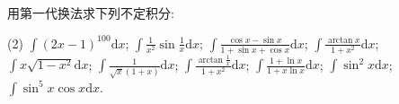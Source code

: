 \begin{exercise}[4.1.2]
    用第一代换法求下列不定积分:
    \begin{tasks}(2)
        \task $\displaystyle \int (2x - 1)^{100} \mathrm{d}x$;
        \task $\displaystyle \int \frac{1}{x^2} \sin \frac{1}{x} \mathrm{d}x$;
        \task $\displaystyle \int \frac{\cos x - \sin x}{1 + \sin x + \cos x} \mathrm{d}x$;
        \task $\displaystyle \int \frac{\arctan x}{1 + x^2} \mathrm{d}x$;
        \task $\displaystyle \int x \sqrt{1 - x^2} \mathrm{d}x$;
        \task $\displaystyle \int \frac{1}{\sqrt{x}(1 + x)} \mathrm{d}x$;
        \task $\displaystyle \int \frac{\arctan \frac{1}{x}}{1 + x^2} \mathrm{d}x$;
        \task $\displaystyle \int \frac{1 + \ln x}{1 + x \ln x} \mathrm{d}x$;
        \task $\displaystyle \int \sin^2 x \mathrm{d}x$;
        \task $\displaystyle \int \sin^5 x \cos x \mathrm{d}x$.
    \end{tasks}
\end{exercise}

